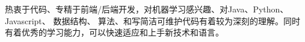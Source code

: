 

\begin{cvparagraph}

热衷于代码、专精于前端/后端开发，对机器学习感兴趣、对Java、Python、 Javascript、 数据结构、 算法、和写简洁可维护代码有着较为深刻的理解。同时有着优秀的学习能力，可以快速适应和上手新技术和语言。
\end{cvparagraph}
